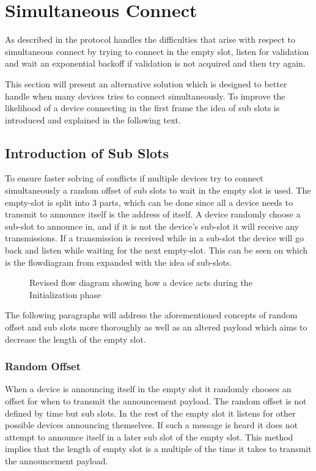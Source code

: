 \section{Simultaneous Connect}
As described in  the protocol handles the difficulties that arise with respect to simultaneous connect by trying to connect in the empty slot, listen for validation and wait an exponential backoff if validation is not acquired and then try again.

This section will present an alternative solution which is designed to better handle when many devices tries to connect simultaneously.
To improve the likelihood of a device connecting in the first frame the idea of sub slots is introduced and explained in the following text.  

\subsection{Introduction of Sub Slots} %
\label{sub:introduction_of_sub_slots}
To ensure faster solving of conflicts if multiple devices try to connect simultaneously a random offset of sub slots to wait in the empty slot is used.
The empty-slot is split into 3 parts, which can be done since all a device needs to transmit to announce itself is the address of itself.
A device randomly choose a sub-slot to announce in, and if it is not the device's sub-slot it will receive any transmissions. 
If a transmission is received while in a sub-slot the device will go back and listen while waiting for the next empty-slot.
This can be seen on  which is the flowdiagram from  expanded with the idea of sub-slots.

\begin{figure}[p]
    \centering \footnotesize
    
    \caption{Revised flow diagram showing how a device acts during the Initialization phase}
    \label{fig:pseudo_flowMultiConnectimp}
\end{figure}

The following paragraphs will address the aforementioned concepts of random offset and sub slots more thoroughly as well as an altered payload which aims to decrease the length of the empty slot.

\subsubsection{Random Offset}\label{roff}
When a device is announcing itself in the empty slot it randomly chooses an offset for when to transmit the announcement payload.
The random offset is not defined by time but sub slots. 
In the rest of the empty slot it listens for other possible devices announcing themselves.
If such a message is heard it does not attempt to announce itself in a later sub slot of the empty slot.
This method implies that the length of empty slot is a multiple of the time it takes to transmit the announcement payload.


